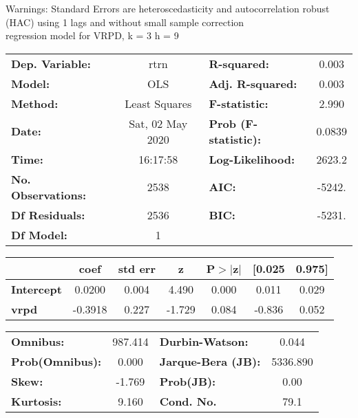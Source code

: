 Warnings: \newline
 [1] Standard Errors are heteroscedasticity and autocorrelation robust (HAC) using 1 lags and without small sample correction\\ 

regression model for VRPD, k = 3 h = 9\begin{center}
\begin{tabular}{lclc}
\toprule
\textbf{Dep. Variable:}    &       rtrn       & \textbf{  R-squared:         } &     0.003   \\
\textbf{Model:}            &       OLS        & \textbf{  Adj. R-squared:    } &     0.003   \\
\textbf{Method:}           &  Least Squares   & \textbf{  F-statistic:       } &     2.990   \\
\textbf{Date:}             & Sat, 02 May 2020 & \textbf{  Prob (F-statistic):} &   0.0839    \\
\textbf{Time:}             &     16:17:58     & \textbf{  Log-Likelihood:    } &    2623.2   \\
\textbf{No. Observations:} &        2538      & \textbf{  AIC:               } &    -5242.   \\
\textbf{Df Residuals:}     &        2536      & \textbf{  BIC:               } &    -5231.   \\
\textbf{Df Model:}         &           1      & \textbf{                     } &             \\
\bottomrule
\end{tabular}
\begin{tabular}{lcccccc}
                   & \textbf{coef} & \textbf{std err} & \textbf{z} & \textbf{P$> |$z$|$} & \textbf{[0.025} & \textbf{0.975]}  \\
\midrule
\textbf{Intercept} &       0.0200  &        0.004     &     4.490  &         0.000        &        0.011    &        0.029     \\
\textbf{vrpd}      &      -0.3918  &        0.227     &    -1.729  &         0.084        &       -0.836    &        0.052     \\
\bottomrule
\end{tabular}
\begin{tabular}{lclc}
\textbf{Omnibus:}       & 987.414 & \textbf{  Durbin-Watson:     } &    0.044  \\
\textbf{Prob(Omnibus):} &   0.000 & \textbf{  Jarque-Bera (JB):  } & 5336.890  \\
\textbf{Skew:}          &  -1.769 & \textbf{  Prob(JB):          } &     0.00  \\
\textbf{Kurtosis:}      &   9.160 & \textbf{  Cond. No.          } &     79.1  \\
\bottomrule
\end{tabular}
\end{center}

